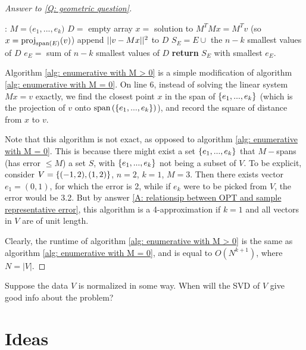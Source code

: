\documentclass{article}
\begin{document}
\begin{proof}[Answer to \ref{Q: geometric question}]
\begin{algorithm}[H]
      \caption{}\label{alg: enumerative with M > 0}
    \begin{algorithmic}[1]
    :
        \State $M = \Big(e_1,...,e_k\Big)$
        \State $D = $ empty array
            \State $x=$ solution to $M^TMx = M^Tv$ (so $x=\text{proj}_{\text{span}\left(E\right)}(v)$)
            \State append $||v-Mx||^2$ to $D$
        \EndFor
        \State $S_E = E\cup$ the $n-k$ smallest values of $D$
        \State $e_E = $ sum of $n-k$ smallest values of $D$
    \EndFor
    \State \textbf{return} $S_E$ with smallest $e_E$.
    \EndProcedure
    \end{algorithmic}
\end{algorithm}
Algorithm \ref{alg: enumerative with M > 0} is a simple modification of algorithm \ref{alg: enumerative with M = 0}. On line 6, instead of solving the linear system $Mx = v$ exactly, we find the closest point $x$ in the span of $\left\{e_1,...,e_k\right\}$ (which is the projection of $v$ onto $\text{span}\left(\left\{e_1,...,e_k\right\}\right)$), and record the square of distance from $x$ to $v$.

Note that this algorithm is not exact, as opposed to algorithm \ref{alg: enumerative with M = 0}. This is because there might exist a set $\left\{e_1,...,e_k\right\}$ that $M-$spans (has error $\leq M$) a set $S$, with $\left\{e_1,...,e_k\right\}$ not being a subset of $V$. To be explicit, consider $V=\left\{(-1,2),(1,2)\right\}$, $n=2$, $k=1$, $M = 3$. Then there exists vector $e_1=(0,1)$, for which the error is 2, while if $e_k$ were to be picked from $V$, the error would be 3.2. But by answer \ref{A: relationsip between OPT and sample representative error}, this algorithm is a 4-approximation if $k=1$ and all vectors in $V$ are of unit length.

Clearly, the runtime of algorithm \ref{alg: enumerative with M > 0} is the same as algorithm \ref{alg: enumerative with M = 0}, and is equal to $O(N^{k+1})$, where $N = |V|$.
\end{proof}

\begin{question}
    Suppose the data $V$ is normalized in some way. When will the SVD of $V$ give good info about the problem?
\end{question}

\section{Ideas}
\end{document}
